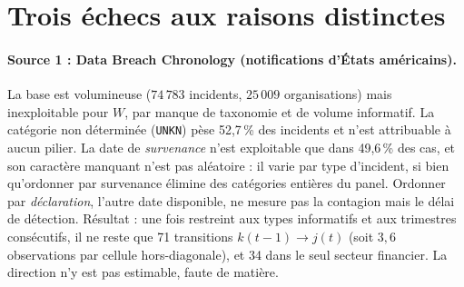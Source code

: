 \section{Trois échecs aux raisons distinctes}

\paragraph{Source 1 : Data Breach Chronology (notifications d'États américains).}
La base est volumineuse ($74\,783$ incidents, $25\,009$ organisations) mais inexploitable
pour $W$, par manque de taxonomie et de volume informatif. La catégorie
non déterminée (\texttt{UNKN}) pèse 52,7\,\% des incidents et n'est attribuable à
aucun pilier. La date de \emph{survenance} n'est exploitable que dans 49,6\,\% des
cas, et son caractère manquant n'est pas aléatoire : il varie par type d'incident, si bien
qu'ordonner par survenance élimine des catégories entières du panel. Ordonner par
\emph{déclaration}, l'autre date disponible, ne mesure pas la contagion mais le
délai de détection. Résultat : une fois restreint aux types informatifs et aux
trimestres consécutifs, il ne reste que 71 transitions $k(t\!-\!1)\to j(t)$ (soit
$3{,}6$ observations par cellule hors-diagonale), et 34 dans le seul secteur
financier. La direction n'y est pas estimable, faute de matière.

